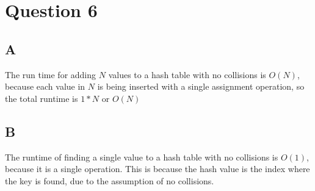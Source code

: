 \documentclass[12pt]{article} %
\begin{document}
\section{Question 6}
\subsection{A}
The run time for adding $N$ values to a hash table with no collisions is $O(N)$, because each value in $N$ is being inserted with a single assignment operation, so the total runtime is $1*N$ or $O(N)$
\subsection{B}
The runtime of finding a single value to a hash table with no collisions is $O(1)$, because it is a single operation. This is because the hash value is the index where the key is found, due to the assumption of no collisions.
\end{document}
